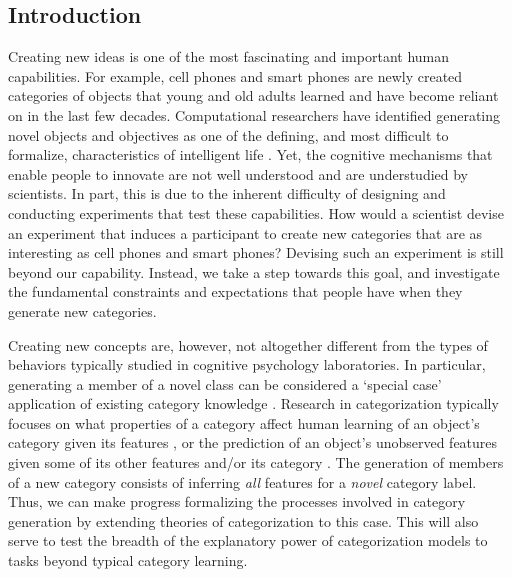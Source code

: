 \documentclass[12pt]{article}
\begin{document}
\begin{flushleft}

\section{Introduction}
\setlength\parindent{0.5in}

Creating new ideas is one of the most fascinating and important
human capabilities. For example, cell phones and smart phones are newly created
categories of objects that young and old adults learned and have become reliant
on in the last few decades. Computational researchers have identified
generating novel objects and objectives as one of the defining, and most
difficult to formalize, characteristics of intelligent life
\citep{lake2017,lehman2011,taylor2016}. Yet, the cognitive mechanisms that
enable people to innovate are not well understood and
are understudied by scientists. In part, this is due to the inherent difficulty
of designing and conducting experiments that test these capabilities. How would
a scientist devise an experiment that induces a participant to create 
new categories that are as interesting as cell phones and smart phones? Devising such an experiment is still beyond our capability. Instead, we take a step towards this goal, and investigate the fundamental constraints and expectations that people have when they generate new categories.


Creating new concepts are, however, not altogether different from
the types of behaviors typically studied in cognitive psychology laboratories.
In particular, generating a member of a novel class can be considered a `special
case' application of existing category knowledge
\citep{kemp2014taxonomy,kurtz2015human}. Research in categorization typically
focuses on what properties of a category affect human learning of an object's
category given its features \citep{shepard1961learning,kurtz2013human}, or the
prediction of an object's unobserved features given some of its other features
and/or its category \citep{markman2003category}. The generation of members of a
new category consists of inferring {\em all} features for a {\em novel} category
label. Thus, we can make progress formalizing the processes involved in category
generation by extending theories of categorization to this case. This will also serve to test the breadth of the explanatory power of categorization models to tasks beyond typical category learning.


\end{flushleft}
\end{document}
